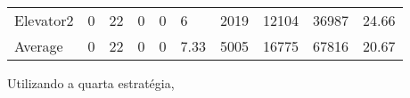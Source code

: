 \documentclass[a4paper]{article}
\begin{document}
\begin{table}[h]
\begin{tabular}{@{}llllllllll@{}}
Elevator2 & 0        & 22            & 0           & 0                                                               & 6                                                                  & 2019                                                         & 12104                                                 & 36987                                                   & 24.66         \\
Average   & 0     & 22         & 0        & 0                                                               & 7.33                                                               & 5005                                                         & 16775                                                 &  67816                                                  & 20.67         \\ \bottomrule
\end{tabular}
\end{table}

Utilizando a quarta estratégia,
\end{document}
